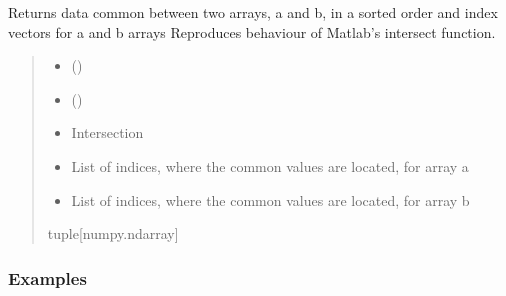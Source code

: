 \documentclass[letterpaper,10pt,english]{sphinxmanual}
\begin{document}
\begin{fulllineitems}
\label{\detokenize{misc:glomar_gridding.utils.intersect_mtlb}}
\pysigstartsignatures
\pysiglinewithargsret
{}
{\sphinxparamcomma {}}
{}
\pysigstopsignatures
\sphinxAtStartPar
Returns data common between two arrays, a and b, in a sorted order and index
vectors for a and b arrays Reproduces behaviour of Matlab’s intersect
function.
\begin{quote}\begin{description}
\begin{itemize}
\item {}
\sphinxAtStartPar
{} ()

\item {}
\sphinxAtStartPar
{} ()

\end{itemize}

\sphinxAtStartPar
\begin{itemize}
\item {}
\sphinxAtStartPar
Intersection

\item {}
\sphinxAtStartPar
List of indices, where the common values are located, for array a

\item {}
\sphinxAtStartPar
List of indices, where the common values are located, for array b

\end{itemize}


\sphinxAtStartPar
tuple{[}numpy.ndarray{]}

\end{description}\end{quote}
\subsubsection*{Examples}

\begin{sphinxVerbatim}[commandchars=\\\{\}]
  \PYG{p}{[}  \PYG{p}{]}
  \PYG{p}{[}    \PYG{p}{]}
 
\end{sphinxVerbatim}

\end{fulllineitems}
\end{document}
